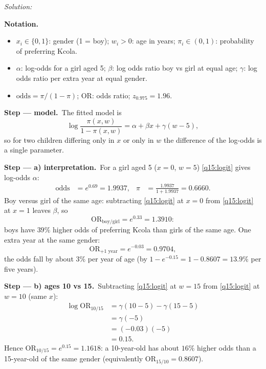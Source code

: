 \documentclass[11pt,a4paper]{article}
\newif\ifsolucoes
\newcommand{\espacoresol}{2.5cm}   %
\numberwithin{equation}{questao}
\newenvironment{notacao}{\par\smallskip\noindent\textbf{Notation.}\begin{itemize}[leftmargin=1.4em,topsep=1pt,itemsep=0pt]\small}{\end{itemize}}
\newcommand{\resolespaco}{\ifsolucoes\else\par\textit{Solution:}\vspace{\espacoresol}\par\fi}
\newcommand{\passo}[2]{\par\smallskip\noindent\textbf{Step --- #1.}~#2}
\begin{document}
\resolespaco
\begin{sol}
\begin{notacao}
\item $x_i\in\{0,1\}$: gender (1 = boy); $w_i>0$: age in years; $\pi_i\in(0,1)$: probability of preferring Kcola.
\item $\alpha$: log-odds for a girl aged 5; $\beta$: log odds ratio boy vs girl at equal age; $\gamma$: log odds ratio per extra year at equal gender.
\item $\mathrm{odds}=\pi/(1-\pi)$; $\mathrm{OR}$: odds ratio; $z_{0.975}=1.96$.
\end{notacao}

\passo{model}{The fitted model is
\begin{equation}
\log\frac{\pi(x,w)}{1-\pi(x,w)}=\alpha+\beta x+\gamma(w-5), \label{q15:logit}
\end{equation}
so for two children differing only in $x$ or only in $w$ the difference of the log-odds is a single parameter.}

\passo{a) interpretation}{For a girl aged 5 ($x=0$, $w=5$) \eqref{q15:logit} gives log-odds $\alpha$:
\begin{align*}
\mathrm{odds}&=e^{0.69}=1.9937, & \pi&=\frac{1.9937}{1+1.9937}=0.6660.
\end{align*}
Boy versus girl of the same age: subtracting \eqref{q15:logit} at $x=0$ from \eqref{q15:logit} at $x=1$ leaves $\beta$, so
\begin{equation*}
\mathrm{OR}_{\text{boy/girl}}=e^{0.33}=1.3910 :
\end{equation*}
boys have $39\%$ higher odds of preferring Kcola than girls of the same age. One extra year at the same gender:
\begin{equation*}
\mathrm{OR}_{+1\text{ year}}=e^{-0.03}=0.9704 ,
\end{equation*}
the odds fall by about $3\%$ per year of age (by $1-e^{-0.15}=1-0.8607=13.9\%$ per five years).}

\passo{b) ages 10 vs 15}{Subtracting \eqref{q15:logit} at $w=15$ from \eqref{q15:logit} at $w=10$ (same $x$):
\begin{align*}
\log\mathrm{OR}_{10/15}&=\gamma(10-5)-\gamma(15-5)\\
&=\gamma(-5)\\
&=(-0.03)(-5)\\
&=0.15 .
\end{align*}
Hence $\mathrm{OR}_{10/15}=e^{0.15}=1.1618$: a 10-year-old has about $16\%$ higher odds than a 15-year-old of the
same gender (equivalently $\mathrm{OR}_{15/10}=0.8607$).}


\end{sol}
\end{document}
